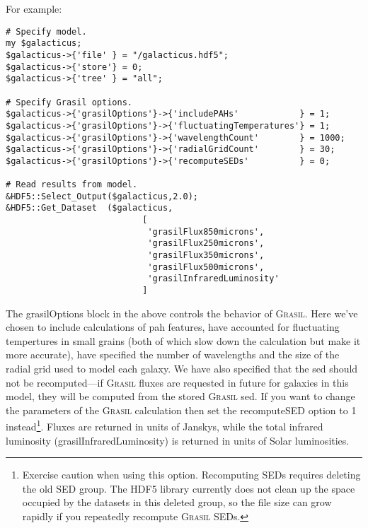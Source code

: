 For example:
\begin{verbatim}
# Specify model.                                                                                                                 
my $galacticus;
$galacticus->{'file' } = "/galacticus.hdf5";
$galacticus->{'store'} = 0;
$galacticus->{'tree' } = "all";

# Specify Grasil options.                                                                                                        
$galacticus->{'grasilOptions'}->{'includePAHs'            } = 1;
$galacticus->{'grasilOptions'}->{'fluctuatingTemperatures'} = 1;
$galacticus->{'grasilOptions'}->{'wavelengthCount'        } = 1000;
$galacticus->{'grasilOptions'}->{'radialGridCount'        } = 30;
$galacticus->{'grasilOptions'}->{'recomputeSEDs'          } = 0;

# Read results from model.                                                                                                       
&HDF5::Select_Output($galacticus,2.0);
&HDF5::Get_Dataset  ($galacticus,
                           [
                            'grasilFlux850microns',
                            'grasilFlux250microns',
                            'grasilFlux350microns',
                            'grasilFlux500microns',
                            'grasilInfraredLuminosity'
                           ]
\end{verbatim}
The {\normalfont \ttfamily grasilOptions} block in the above controls the behavior of {\normalfont \scshape Grasil}. Here we've chosen to include calculations of \gls{pah} features, have accounted for fluctuating tempertures in small grains (both of which slow down the calculation but make it more accurate), have specified the number of wavelengths and the size of the radial grid used to model each galaxy. We have also specified that the \gls{sed} should not be recomputed---if {\normalfont \scshape Grasil} fluxes are requested in future for galaxies in this model, they will be computed from the stored {\normalfont \scshape Grasil} \gls{sed}. If you want to change the parameters of the {\normalfont \scshape Grasil} calculation then set the {\normalfont \ttfamily recomputeSED} option to 1 instead\footnote{Exercise caution when using this option. Recomputing SEDs requires deleting the old SED group. The HDF5 library currently does not clean up the space occupied by the datasets in this deleted group, so the file size can grow rapidly if you repeatedly recompute {\normalfont \scshape Grasil} SEDs.}. Fluxes are returned in units of Janskys, while the total infrared luminosity ({\normalfont \ttfamily grasilInfraredLuminosity}) is returned in units of Solar luminosities.

